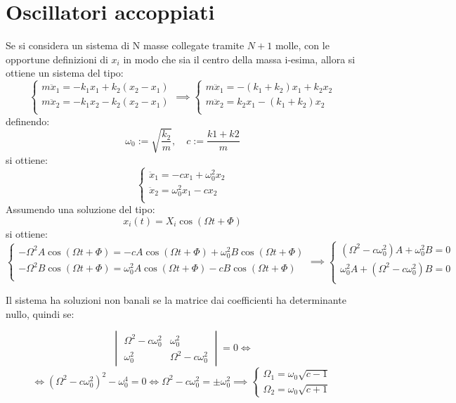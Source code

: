 \documentclass[11pt, a4paper, openright]{book}
\theoremstyle{plain}
\theoremstyle{definition}
\begin{document}
\section{Oscillatori accoppiati}
Se si considera un sistema di N masse collegate tramite $N + 1$ molle, con le opportune definizioni di $x_i$ in modo che sia il centro della massa i-esima, allora si ottiene un sistema del tipo:
\[\begin{cases}
    m\ddot{x}_1 = -k_1x_1 + k_2(x_2 - x_1) \\
    m\ddot{x}_2 = -k_1x_2 - k_2(x_2 - x_1) \\
\end{cases} \implies 
\begin{cases}
    m\ddot{x}_1 = -(k_1 + k_2)x_1 + k_2x_2 \\
    m\ddot{x}_2 = k_2x_1 -(k_1 + k_2)x_2  \\
\end{cases}\]
definendo:
\[\omega_0 := \sqrt{\frac{k_2}{m}}, \quad c := \frac{k1 + k2}{m}\]
si ottiene:
\[\begin{cases}
    \ddot{x}_1 = -cx_1 + \omega_0^2x_2 \\
    \ddot{x}_2 = \omega_0^2x_1 -cx_2   \\
\end{cases}\]
Assumendo una soluzione del tipo:
\[x_i (t) = X_i\cos(\Omega t +\Phi)\]
si ottiene:
\[\begin{cases}
    -\Omega^2A\cos(\Omega t +\Phi) = -cA\cos(\Omega t +\Phi) + \omega_0^2B\cos(\Omega t +\Phi) \\
    -\Omega^2B\cos(\Omega t +\Phi) = \omega_0^2A\cos(\Omega t +\Phi) -cB\cos(\Omega t +\Phi)   \\
\end{cases} \implies \begin{cases}
    (\Omega^2 - c\omega_0^2)A + \omega_0^2B = 0 \\
    \omega_0^2A + (\Omega^2 - c\omega_0^2)B = 0  \\
\end{cases}
\]

Il sistema ha soluzioni non banali se la matrice dai coefficienti ha determinante nullo, quindi se:

\[\begin{vmatrix}
    \Omega^2 - c\omega_0^2 & \omega_0^2\\
    \omega_0^2& \Omega^2 - c\omega_0^2
\end{vmatrix} = 0 \iff \]
\[\iff (\Omega^2 - c\omega_0^2)^2 - \omega_0^4 = 0 \iff \Omega^2 - c\omega_0^2 = \pm \omega_0^2 \implies \begin{cases}
    \Omega_1 = \omega_0\sqrt{c - 1} \\
    \Omega_2 = \omega_0\sqrt{c + 1}
\end{cases}\]
\end{document}
